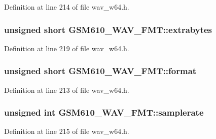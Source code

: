 Definition at line 214 of file wav\+\_\+w64.\+h.

\subsubsection[{\texorpdfstring{extrabytes}{extrabytes}}]{\setlength{\rightskip}{0pt plus 5cm}unsigned short G\+S\+M610\+\_\+\+W\+A\+V\+\_\+\+F\+M\+T\+::extrabytes}\hypertarget{struct_g_s_m610___w_a_v___f_m_t_ab22852020d7b6d48dcbe044dff1dfc38}{}\label{struct_g_s_m610___w_a_v___f_m_t_ab22852020d7b6d48dcbe044dff1dfc38}


Definition at line 219 of file wav\+\_\+w64.\+h.

\subsubsection[{\texorpdfstring{format}{format}}]{\setlength{\rightskip}{0pt plus 5cm}unsigned short G\+S\+M610\+\_\+\+W\+A\+V\+\_\+\+F\+M\+T\+::format}\hypertarget{struct_g_s_m610___w_a_v___f_m_t_a39a13b66afc014f1660c87288139d32c}{}\label{struct_g_s_m610___w_a_v___f_m_t_a39a13b66afc014f1660c87288139d32c}


Definition at line 213 of file wav\+\_\+w64.\+h.

\subsubsection[{\texorpdfstring{samplerate}{samplerate}}]{\setlength{\rightskip}{0pt plus 5cm}unsigned {\bf int} G\+S\+M610\+\_\+\+W\+A\+V\+\_\+\+F\+M\+T\+::samplerate}\hypertarget{struct_g_s_m610___w_a_v___f_m_t_ac960a679e75e2e7c41d7d72681b96b81}{}\label{struct_g_s_m610___w_a_v___f_m_t_ac960a679e75e2e7c41d7d72681b96b81}


Definition at line 215 of file wav\+\_\+w64.\+h.

